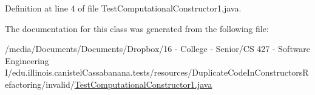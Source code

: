 Definition at line 4 of file TestComputationalConstructor1.java.



The documentation for this class was generated from the following file:\begin{DoxyCompactItemize}
\item 
/media/Documents/Documents/Dropbox/16 -\/ College -\/ Senior/CS 427 -\/ Software Engineering I/edu.illinois.canistelCassabanana.tests/resources/DuplicateCodeInConstructorsRefactoring/invalid/\hyperlink{TestComputationalConstructor1_8java}{TestComputationalConstructor1.java}\end{DoxyCompactItemize}
